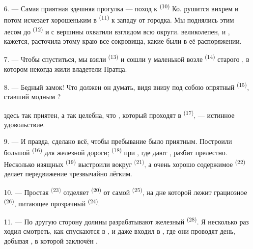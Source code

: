 \VUsaut{3.0mm}
\VUsaut{3.0mm}

6. --- Самая приятная здешняя прогулка --- поход к 
\textsuperscript{(10)} Ко.  рушится вихрем и потом исчезает
хорошеньким  в  \textsuperscript{(11)} к западу
от городка. Мы поднялись этим лесом до 
\textsuperscript{(12)} и с вершины  охватили взглядом всю
 округи.  великолепен, и ,
кажется, расточила этому краю все сокровища, какие были в её
распоряжении.

7. --- Чтобы спуститься, мы взяли  \textsuperscript{(13)} и
сошли у маленькой  возле  \textsuperscript{(14)}
старого , в котором некогда жили владетели
Пратца.

8. --- Бедный замок! Что должен он думать, видя внизу под собою опрятный
 \textsuperscript{(15)}, ставший модным
?

 здесь так приятен, а  так
целебна, что , который проходят в 
\textsuperscript{(17)}, --- истинное удовольствие.

\VUsaut{3.0mm}
\VUsaut{3.0mm}

9. --- И правда, сделано всё, чтобы пребывание было приятным. Построили
большой  \textsuperscript{(16)} для железной дороги;
 \textsuperscript{(18)} при , где дают
, разбит прелестно. Несколько изящных  \textsuperscript{(19)}
выстроили вокруг  \textsuperscript{(21)}, а очень хорошо
содержимое  \textsuperscript{(22)} делает передвижение чрезвычайно
лёгким.

10. --- Простая  \textsuperscript{(23)} отделяет 
\textsuperscript{(20)} от самой  \textsuperscript{(25)}, на дне которой
лежит грациозное  \textsuperscript{(26)}, питающее прозрачный
 \textsuperscript{(24)}.

11. --- По другую сторону долины разрабатывают железный 
\textsuperscript{(28)}. Я несколько раз ходил смотреть, как 
спускаются в , и даже входил в , где они
проводят день, добывая , в которой заключён .

